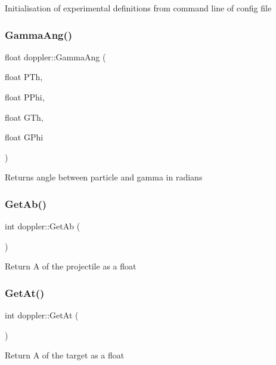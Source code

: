 Initialisation of experimental definitions from command line of config file \mbox{\label{classdoppler_a6dca381f91f2267abefadd62cf66f69f}} 
\subsubsection{\texorpdfstring{Gamma\+Ang()}{GammaAng()}}
{\footnotesize\ttfamily float doppler\+::\+Gamma\+Ang (\begin{DoxyParamCaption}\item[{float}]{P\+Th,  }\item[{float}]{P\+Phi,  }\item[{float}]{G\+Th,  }\item[{float}]{G\+Phi }\end{DoxyParamCaption})}

Returns angle between particle and gamma in radians \mbox{\label{classdoppler_ac3cde63421ff794992231027245ceced}} 
\subsubsection{\texorpdfstring{Get\+Ab()}{GetAb()}}
{\footnotesize\ttfamily int doppler\+::\+Get\+Ab (\begin{DoxyParamCaption}{ }\end{DoxyParamCaption})}

Return A of the projectile as a float \mbox{\label{classdoppler_a72bb0dc1707c0f2bf4b978caf06f2cf1}} 
\subsubsection{\texorpdfstring{Get\+At()}{GetAt()}}
{\footnotesize\ttfamily int doppler\+::\+Get\+At (\begin{DoxyParamCaption}{ }\end{DoxyParamCaption})}

Return A of the target as a float \mbox{\label{classdoppler_a182d987ddc6db4a8b8e7f7821bda3846}} 
